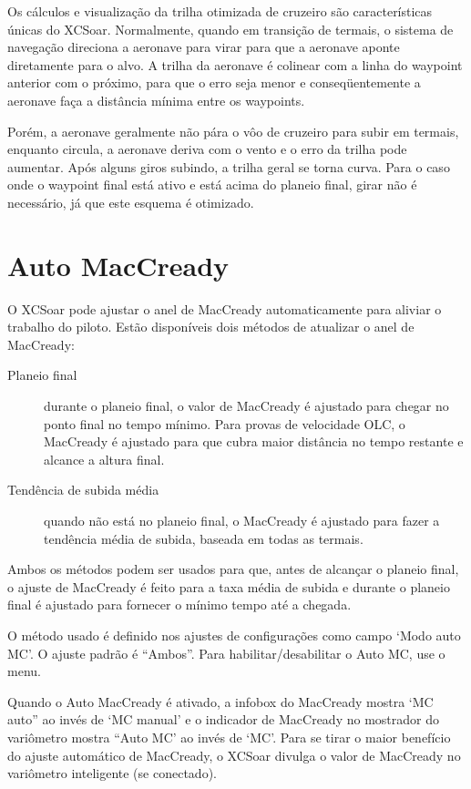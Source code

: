 Os cálculos e visualização da trilha otimizada de cruzeiro são características únicas do XCSoar.  Normalmente, quando em transição de termais, o sistema de navegação direciona a aeronave para virar para que a aeronave aponte diretamente para o alvo.  A trilha da aeronave é colinear com a linha do waypoint anterior com o próximo, para que o erro seja menor e conseqüentemente a aeronave faça a distância mínima entre os waypoints.

Porém, a aeronave geralmente não pára o vôo de cruzeiro para subir em termais, enquanto circula, a aeronave deriva com o vento e o erro da trilha pode aumentar.  Após alguns giros subindo, a trilha geral se torna curva. 
%
Para o caso onde o waypoint final está ativo e está acima do planeio final, girar não é necessário, já que este esquema é otimizado.


\section{Auto MacCready}\label{sec:auto-maccready}

O XCSoar pode ajustar o anel de MacCready automaticamente para aliviar o trabalho do piloto.  Estão disponíveis dois métodos de atualizar o anel de MacCready:
\begin{description}
\item[Planeio final]  durante o planeio final, o valor de MacCready é ajustado para chegar no ponto final no tempo mínimo.  Para provas de velocidade OLC, o MacCready é ajustado para que cubra maior distância no tempo restante e alcance a altura final.
\item[Tendência de subida média] quando não está no planeio final, o MacCready é ajustado para fazer a tendência média de subida, baseada em todas as termais.
\end{description}
Ambos os métodos podem ser usados para que, antes de alcançar o planeio final, o ajuste de MacCready é feito para a taxa média de subida e durante o planeio final é ajustado para fornecer o mínimo tempo até a chegada.

O método usado é definido nos ajustes de configurações como campo ‘Modo auto MC’.  O ajuste padrão é “Ambos”.  Para habilitar/desabilitar o Auto MC, use o menu.  


Quando o Auto MacCready é ativado, a infobox do MacCready mostra ‘MC auto” ao invés de ‘MC manual’ e o indicador de MacCready no mostrador do variômetro mostra “Auto MC’ ao invés de ‘MC’.  Para se tirar o maior benefício do ajuste automático de MacCready, o XCSoar divulga o valor de MacCready no variômetro inteligente (se conectado).

